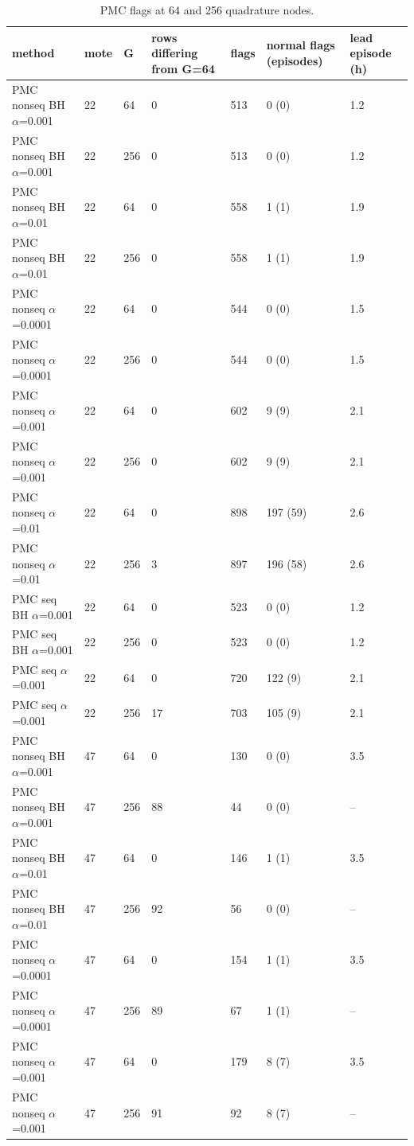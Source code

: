 \begin{table}[ht]
\centering\small
\caption{PMC flags at 64 and 256 quadrature nodes.}
\label{tab:il-detect-check}
\begin{tabular}{lllllll}
\toprule
method & mote & G & rows differing from G=64 & flags & normal flags (episodes) & lead episode (h) \\
\midrule
PMC nonseq BH $\alpha$=0.001 & 22 & 64 & 0 & 513 & 0 (0) & 1.2 \\
PMC nonseq BH $\alpha$=0.001 & 22 & 256 & 0 & 513 & 0 (0) & 1.2 \\
PMC nonseq BH $\alpha$=0.01 & 22 & 64 & 0 & 558 & 1 (1) & 1.9 \\
PMC nonseq BH $\alpha$=0.01 & 22 & 256 & 0 & 558 & 1 (1) & 1.9 \\
PMC nonseq $\alpha$=0.0001 & 22 & 64 & 0 & 544 & 0 (0) & 1.5 \\
PMC nonseq $\alpha$=0.0001 & 22 & 256 & 0 & 544 & 0 (0) & 1.5 \\
PMC nonseq $\alpha$=0.001 & 22 & 64 & 0 & 602 & 9 (9) & 2.1 \\
PMC nonseq $\alpha$=0.001 & 22 & 256 & 0 & 602 & 9 (9) & 2.1 \\
PMC nonseq $\alpha$=0.01 & 22 & 64 & 0 & 898 & 197 (59) & 2.6 \\
PMC nonseq $\alpha$=0.01 & 22 & 256 & 3 & 897 & 196 (58) & 2.6 \\
PMC seq BH $\alpha$=0.001 & 22 & 64 & 0 & 523 & 0 (0) & 1.2 \\
PMC seq BH $\alpha$=0.001 & 22 & 256 & 0 & 523 & 0 (0) & 1.2 \\
PMC seq $\alpha$=0.001 & 22 & 64 & 0 & 720 & 122 (9) & 2.1 \\
PMC seq $\alpha$=0.001 & 22 & 256 & 17 & 703 & 105 (9) & 2.1 \\
PMC nonseq BH $\alpha$=0.001 & 47 & 64 & 0 & 130 & 0 (0) & 3.5 \\
PMC nonseq BH $\alpha$=0.001 & 47 & 256 & 88 & 44 & 0 (0) & -- \\
PMC nonseq BH $\alpha$=0.01 & 47 & 64 & 0 & 146 & 1 (1) & 3.5 \\
PMC nonseq BH $\alpha$=0.01 & 47 & 256 & 92 & 56 & 0 (0) & -- \\
PMC nonseq $\alpha$=0.0001 & 47 & 64 & 0 & 154 & 1 (1) & 3.5 \\
PMC nonseq $\alpha$=0.0001 & 47 & 256 & 89 & 67 & 1 (1) & -- \\
PMC nonseq $\alpha$=0.001 & 47 & 64 & 0 & 179 & 8 (7) & 3.5 \\
PMC nonseq $\alpha$=0.001 & 47 & 256 & 91 & 92 & 8 (7) & -- \\

\end{tabular}
\end{table}
